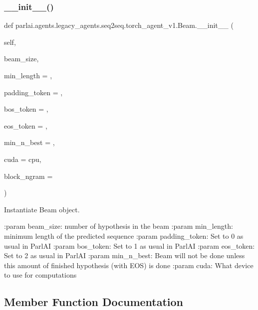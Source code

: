 \subsubsection{\texorpdfstring{\+\_\+\+\_\+init\+\_\+\+\_\+()}{\_\_init\_\_()}}
{\footnotesize\ttfamily def parlai.\+agents.\+legacy\+\_\+agents.\+seq2seq.\+torch\+\_\+agent\+\_\+v1.\+Beam.\+\_\+\+\_\+init\+\_\+\+\_\+ (\begin{DoxyParamCaption}\item[{}]{self,  }\item[{}]{beam\+\_\+size,  }\item[{}]{min\+\_\+length = {},  }\item[{}]{padding\+\_\+token = {},  }\item[{}]{bos\+\_\+token = {},  }\item[{}]{eos\+\_\+token = {},  }\item[{}]{min\+\_\+n\+\_\+best = {},  }\item[{}]{cuda = {\ttfamily \textquotesingle{}cpu\textquotesingle{}},  }\item[{}]{block\+\_\+ngram = {} }\end{DoxyParamCaption})}

\begin{DoxyVerb}Instantiate Beam object.

:param beam_size: number of hypothesis in the beam
:param min_length: minimum length of the predicted sequence
:param padding_token: Set to 0 as usual in ParlAI
:param bos_token: Set to 1 as usual in ParlAI
:param eos_token: Set to 2 as usual in ParlAI
:param min_n_best: Beam will not be done unless this amount of finished
           hypothesis (with EOS) is done
:param cuda: What device to use for computations
\end{DoxyVerb}
 

\subsection{Member Function Documentation}
\mbox{\label{classparlai_1_1agents_1_1legacy__agents_1_1seq2seq_1_1torch__agent__v1_1_1Beam_a6c6cf89b73830b99bba0420c720c50d8}} 
